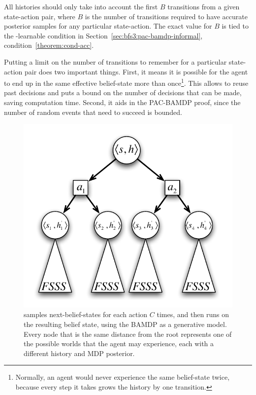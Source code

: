All histories should only take into account the first $B$ transitions from a given state-action pair, where $B$ is the number of transitions required to have accurate posterior samples for any particular state-action. The exact value for $B$ is tied to the \bed-learnable condition in Section~\ref{sec:bfs3:pac-bamdp-informal}, condition~\ref{theorem:cond-acc}.

Putting a limit on the number of transitions to remember for a particular state-action pair does two important things. First, it means it is possible for the agent to end up in the same effective belief-state more than once\footnote{Normally, an agent would never experience the same belief-state twice, because every step it takes grows the history by one transition.}. This allows  to reuse past decisions and puts a bound on the number of decisions that can be made, saving computation time. Second, it aids in the PAC-BAMDP proof, since the number of random events that need to succeed is bounded.

\begin{figure}
\vskip 0.2in
\begin{center}
\centerline{\includegraphics[scale=0.5]{bfs3}}
\caption{
 samples next-belief-states for each action $C$ times, and then runs  on the resulting belief state, using the BAMDP as a generative model. Every node that is the same distance from the root represents one of the possible worlds that the agent may experience, each with a different history and MDP posterior.
}
\label{fig:bfs3}
\end{center}
\vskip -0.2in
\end{figure} 

